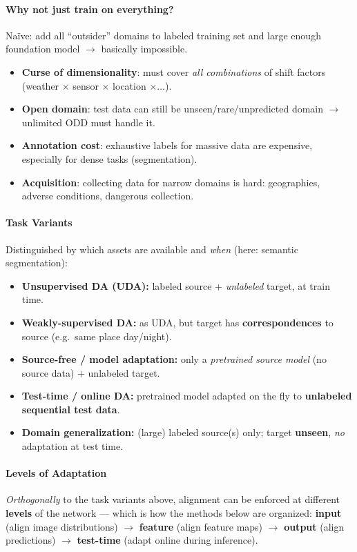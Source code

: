 \documentclass{article}
\begin{document}
\paragraph{Why not just train on everything?} Naïve: add all ``outsider'' domains to labeled training set and large enough foundation model $\rightarrow$ basically impossible.
\begin{itemize}
    \item \textbf{Curse of dimensionality}: must cover \textit{all combinations} of shift factors (weather $\times$ sensor $\times$ location $\times\dots$).
    \item \textbf{Open domain}: test data can still be unseen/rare/unpredicted domain $\rightarrow$ unlimited ODD must handle it.
    \item \textbf{Annotation cost}: exhaustive labels for massive data are expensive, especially for dense tasks (segmentation).
    \item \textbf{Acquisition}: collecting data for narrow domains is hard: geographies, adverse conditions, dangerous collection.
\end{itemize}

\paragraph{Task Variants} Distinguished by which assets are available and \textit{when} (here: semantic segmentation):
\begin{itemize}
    \item \textbf{Unsupervised DA (UDA):} labeled source + \textit{unlabeled} target, at train time.
    \item \textbf{Weakly-supervised DA:} as UDA, but target has \textbf{correspondences} to source (e.g.\ same place day/night).
    \item \textbf{Source-free / model adaptation:} only a \textit{pretrained source model} (no source data) + unlabeled target.
    \item \textbf{Test-time / online DA:} pretrained model adapted on the fly to \textbf{unlabeled sequential test data}.
    \item \textbf{Domain generalization:} (large) labeled source(s) only; target \textbf{unseen}, \textit{no} adaptation at test time.
\end{itemize}

\paragraph{Levels of Adaptation} \textit{Orthogonally} to the task variants above, alignment can be enforced at different \textbf{levels} of the network --- which is how the methods below are organized: \textbf{input} (align image distributions) $\rightarrow$ \textbf{feature} (align feature maps) $\rightarrow$ \textbf{output} (align predictions) $\rightarrow$ \textbf{test-time} (adapt online during inference).
\end{document}
